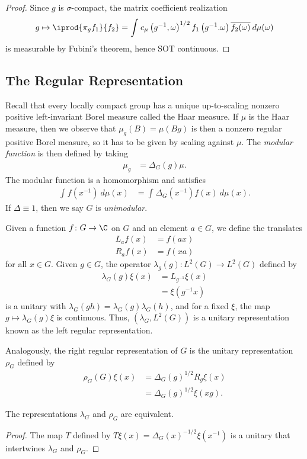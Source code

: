 \documentclass[10pt]{mypackage}
\begin{document}
\begin{proof}
  Since $g$ is $\sigma$-compact, the matrix coefficient realization
  \begin{align*}
    g\mapsto \iprod{\pi_gf_1}{f_2} = \int_{}^{} c_{\mu}\left( g^{-1},\omega \right)^{1/2} f_1\left( g^{-1}.\omega \right) \overline{f_2(\omega)}\:d\mu(\omega)
  \end{align*}
  is measurable by Fubini's theorem, hence SOT continuous.
\end{proof}
\subsection{The Regular Representation}%
Recall that every locally compact group has a unique up-to-scaling nonzero positive left-invariant Borel measure called the Haar measure. If $\mu$ is the Haar measure, then we observe that $\mu_g\left( B \right) = \mu\left( Bg \right)$ is then a nonzero regular positive Borel measure, so it has to be given by scaling against $\mu$. The \textit{modular function} is then defined by taking
\begin{align*}
  \mu_g &= \Delta_G\left( g \right)\mu.
\end{align*}
The modular function is a homomorphism and satisfies
\begin{align*}
  \int_{}^{} f\left( x^{-1} \right)\:d\mu(x) &= \int_{}^{} \Delta_G\left( x^{-1} \right)f(x)\:d\mu(x).
\end{align*}
If $\Delta\equiv 1$, then we say $G$ is \textit{unimodular}.

Given a function $f\colon G\to \C$ on $G$ and an element $a\in G$, we define the translates
\begin{align*}
  L_af(x) &= f\left( ax \right)\\
  R_af(x) &= f\left( xa \right)
\end{align*}
for all $x\in G$. Given $g\in G$, the operator $\lambda_g(g)\colon L^2\left( G \right)\to L^2\left( G \right)$ defined by
\begin{align*}
  \lambda_G(g)\xi(x) &= L_{g^{-1}}\xi(x)\\
                     &= \xi\left( g^{-1}x \right)
\end{align*}
is a unitary with $\lambda_G\left( gh \right) = \lambda_G(g)\lambda_G(h)$, and for a fixed $\xi$, the map $g\mapsto \lambda_G(g)\xi$ is continuous. Thus, $\left( \lambda_G,L^2\left( G \right) \right)$ is a unitary representation known as the left regular representation.

Analogously, the right regular representation of $G$ is the unitary representation $\rho_G$ defined by
\begin{align*}
  \rho_G(G)\xi(x) &= \Delta_G\left( g \right)^{1/2}R_g\xi(x)\\
                  &= \Delta_G(g)^{1/2}\xi\left( xg \right).
\end{align*}
\begin{proposition}
  The representations $\lambda_G$ and $\rho_G$ are equivalent.
\end{proposition}
\begin{proof}
  The map $T$ defined by $T\xi(x) = \Delta_G(x)^{-1/2}\xi\left( x^{-1} \right)$ is a unitary that intertwines $\lambda_G$ and $\rho_G$.
\end{proof}
\end{document}
